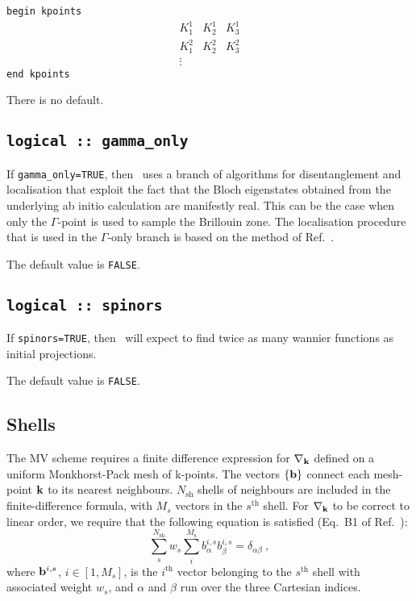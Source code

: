 \noindent \verb#begin kpoints# \\
$$
\begin{array}{ccc}
 K^{1}_{1} & K^{1}_{2} & K^{1}_{3} \\
 K^{2}_{1} & K^{2}_{2} & K^{2}_{3} \\
\vdots
\end{array}
$$
\verb#end kpoints#


There is no default.


\subsection[gamma\_only]{{\tt logical :: gamma\_only}}

If {\tt gamma\_only=TRUE}, then \wannier\ uses a branch of algorithms
for disentanglement and localisation that exploit the fact that the 
Bloch eigenstates obtained from the underlying ab initio calculation
are manifestly real. This can be the case when only the $\Gamma$-point
is used to sample the Brillouin zone. The localisation procedure
that is used in the $\Gamma$-only branch is based on the method of
Ref.~\cite{Gygi}.

The default value is {\tt FALSE}.


\subsection[spinors]{{\tt logical :: spinors}}

If {\tt spinors=TRUE}, then \wannier\ will expect to find twice as many
wannier functions as initial projections.

The default value is {\tt FALSE}.

\subsection{Shells}

The MV scheme requires a finite difference expression
for $\nabla_{\bf k}$ defined on a uniform Monkhorst-Pack mesh of
k-points. The vectors $\{{\bf b}\}$ connect each mesh-point ${\bf k}$
  to its nearest neighbours. $N_{\mathrm{sh}}$ shells of neighbours
  are included in the finite-difference formula, with $M_s$ vectors in
  the $s^{\mathrm{th}}$ shell. For $\nabla_{{\bf k}}$ to be correct to
  linear order, we require that the following equation is satisfied
  (Eq.~B1 of Ref.~\cite{MV}):
\begin{equation}\label{eq:B1}
\sum_{s}^{N_{\mathrm{sh}}} w_s \sum_i^{M_{\mathrm{s}}}
b_{\alpha}^{i,s} b_{\beta}^{i,s} = \delta_{\alpha\beta}\:, 
\end{equation}
where ${\bf b}^{i,s}$, $i\in[1,M_s]$, is the
$i^{\mathrm{th}}$ vector belonging to the $s^{\mathrm{th}}$ shell
with associated weight $w_s$, and $\alpha$ and $\beta$ run over the
three Cartesian indices. 


